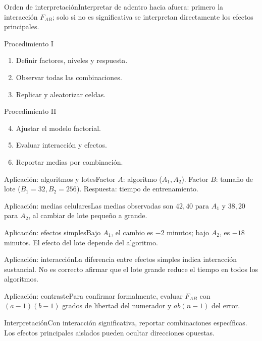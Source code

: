 \documentclass[10pt,aspectratio=169]{beamer}
\begin{document}
\begin{frame}{Orden de interpretación}\small Interpretar de adentro hacia afuera: primero la interacción $F_{AB}$; solo si no es significativa se interpretan directamente los efectos principales.\end{frame}
\begin{frame}{Procedimiento I}\small\begin{enumerate}\item Definir factores, niveles y respuesta.\item Observar todas las combinaciones.\item Replicar y aleatorizar celdas.\end{enumerate}\end{frame}
\begin{frame}{Procedimiento II}\small\begin{enumerate}\setcounter{enumi}{3}\item Ajustar el modelo factorial.\item Evaluar interacción y efectos.\item Reportar medias por combinación.\end{enumerate}\end{frame}
\begin{frame}{Aplicación: algoritmos y lotes}\small Factor $A$: algoritmo ($A_1,A_2$). Factor $B$: tamaño de lote ($B_1=32,B_2=256$). Respuesta: tiempo de entrenamiento.\end{frame}
\begin{frame}{Aplicación: medias celulares}\small Las medias observadas son $42,40$ para $A_1$ y $38,20$ para $A_2$, al cambiar de lote pequeño a grande.\end{frame}
\begin{frame}{Aplicación: efectos simples}\small Bajo $A_1$, el cambio es $-2$ minutos; bajo $A_2$, es $-18$ minutos. El efecto del lote depende del algoritmo.\end{frame}
\begin{frame}{Aplicación: interacción}\small La diferencia entre efectos simples indica interacción sustancial. No es correcto afirmar que el lote grande reduce el tiempo en todos los algoritmos.\end{frame}
\begin{frame}{Aplicación: contraste}\small Para confirmar formalmente, evaluar $F_{AB}$ con $(a-1)(b-1)$ grados de libertad del numerador y $ab(n-1)$ del error.\end{frame}
\begin{frame}{Interpretación}\small Con interacción significativa, reportar combinaciones específicas. Los efectos principales aislados pueden ocultar direcciones opuestas.\end{frame}
\end{document}
